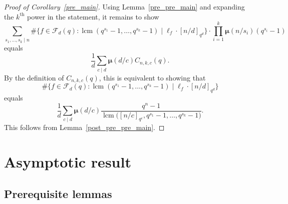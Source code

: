 \documentclass[10pt]{article}
\theoremstyle{definition}
\DeclareMathOperator{\lcm}{lcm}
\newcommand{\CF}{\mathcal{F}}
\newcommand{\moebius}{\pmb{\mu}}
\begin{document}
\begin{proof}[Proof of Corollary~\ref{pre_main}]
Using Lemma~\ref{pre_pre_main} and expanding the \(k^\text{th}\) power in the statement, it remains to show
\[
\sum_{s_1,\ldots,s_k \mid n}
\# \{f \in \CF_d (q) : \lcm(q^{s_1}-1,\ldots,q^{s_k}-1) \mid \ell_f \cdot [n/d]_{q^d}\}
\cdot
\prod_{i=1}^k \moebius(n/s_i)(q^{s_i}-1)
\]
equals
\[
\frac{1}{d} \sum_{c \mid d} \moebius(d/c) C_{n,k,c} (q).
\]
By the definition of \(C_{n,k,c} (q)\),
this is equivalent to showing that
\[
\# \{f \in \CF_d (q) : \lcm(q^{s_1}-1,\ldots,q^{s_k}-1) \mid \ell_f \cdot [n/d]_{q^d} \}
\]
equals
\[
\frac{1}{d}
\sum_{c \mid d}
\moebius(d/c)
\frac{q^n-1}{\lcm \big ( [n/c]_{q^c}, q^{s_1}-1, \ldots, q^{s_k}-1 \big )}.
\]
This follows from Lemma~\ref{post_pre_pre_main}.
\end{proof}






































\section{Asymptotic result}
\label{probabilistic_section}








\subsection{Prerequisite lemmas}
\end{document}
